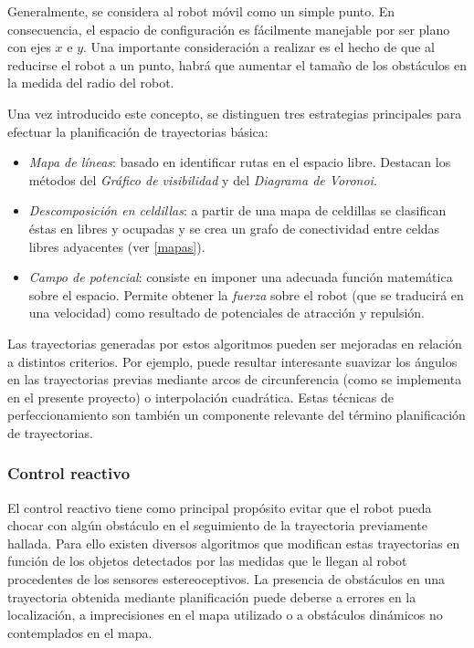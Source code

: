 Generalmente, se considera al robot móvil como un simple punto. En consecuencia, el espacio de configuración es fácilmente manejable por ser plano con ejes $x$ e $y$. Una importante consideración a realizar es el hecho de que al reducirse el robot a un punto, habrá que aumentar el tamaño de los obstáculos en la medida del radio del robot.

Una vez introducido este concepto, se distinguen tres estrategias principales para efectuar la planificación de trayectorias básica:
\begin{itemize}
  \item \emph{Mapa de líneas}: basado en identificar rutas en el espacio libre. Destacan los métodos del \emph{Gráfico de visibilidad } y del \emph{Diagrama de Voronoi}.
  \item \emph{Descomposición en celdillas}: a partir de una mapa de celdillas se clasifican éstas en libres y ocupadas y se crea un grafo de conectividad entre celdas libres adyacentes (ver \ref{mapas}).
  \item \emph{Campo de potencial}: consiste en imponer una adecuada función matemática sobre el espacio. Permite obtener la \emph{fuerza} sobre el robot (que se traducirá en una velocidad) como resultado de potenciales de atracción y repulsión.
\end{itemize}

Las trayectorias generadas por estos algoritmos pueden ser mejoradas en relación a distintos criterios. Por ejemplo, puede resultar interesante suavizar los ángulos en las trayectorias previas mediante arcos de circunferencia (como se implementa en el presente proyecto) o interpolación cuadrática. Estas técnicas de perfeccionamiento son también un componente relevante del término planificación de trayectorias.

\subsubsection{Control reactivo}
El control reactivo tiene como principal propósito evitar que el robot pueda chocar con algún obstáculo en el seguimiento de la trayectoria previamente hallada. Para ello existen diversos algoritmos que modifican estas trayectorias en función de los objetos detectados por las medidas que le llegan al robot procedentes de los sensores estereoceptivos. La presencia de obstáculos en una trayectoria obtenida mediante planificación puede deberse a errores en la localización, a imprecisiones en el mapa utilizado o a obstáculos dinámicos no contemplados en el mapa.

